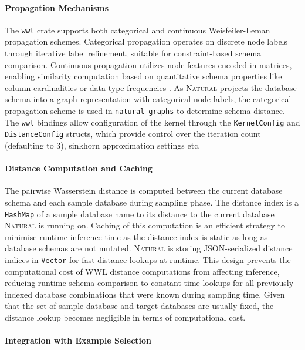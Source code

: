 \paragraph{Propagation Mechanisms}

The \texttt{wwl} crate supports both categorical and continuous Weisfeiler-Leman
propagation schemes. Categorical propagation operates on discrete node labels
through iterative label refinement, suitable for constraint-based schema
comparison. Continuous propagation utilizes node features encoded in matrices,
enabling similarity computation based on quantitative schema properties like
column cardinalities or data type frequencies \citep{WWL}. As \textsc{Natural}
projects the database schema into a graph representation with categorical node
labels, the categorical propagation scheme is used in \texttt{natural-graphs}
to determine schema distance. The \texttt{wwl} bindings allow configuration of
the kernel through the \texttt{KernelConfig} and \texttt{DistanceConfig}
structs, which provide control over the iteration count (defaulting to 3),
sinkhorn approximation settings etc.

\paragraph{Distance Computation and Caching}

The pairwise Wasserstein distance is computed between the current database
schema and each sample database during sampling phase. The distance index is
a \texttt{HashMap} of a sample database name to its distance to the current
database \textsc{Natural} is running on. Caching of this computation is an
efficient strategy to minimise runtime inference time as the distance index is
static as long as database schemas are not mutated. \textsc{Natural} is storing
JSON-serialized distance indices in \texttt{Vector} for fast distance lookups
at runtime. This design prevents the computational cost of WWL distance
computations from affecting inference, reducing runtime schema comparison to
constant-time lookups for all previously indexed database combinations that
were known during sampling time. Given that the set of sample database and
target databases are usually fixed, the distance lookup becomes negligible in
terms of computational cost.

\paragraph{Integration with Example Selection}

